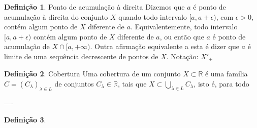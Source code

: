\documentclass{article}
\theoremstyle{definition}
\newtheorem{definition}{Definição}
\theoremstyle{remark}
\theoremstyle{plain}
\theoremstyle{plain}
\theoremstyle{plain}
\begin{document}
    \begin{definition}{Ponto de acumulação à direita}
        Dizemos que $a$ é ponto de acumulação à direita do conjunto $X$ quando todo intervalo $[a, a+\epsilon)$,
        com $\epsilon > 0$, contém algum ponto de $X$ diferente de $a$.
        Equivalentemente, todo intervalo $[a, a+\epsilon)$ contém algum ponto de $X$ diferente de $a$, ou então 
            que $a$ é ponto de acumulação de $X \cap [a, +\infty)$.
        Outra afirmação equivalente a esta é dizer que $a$ é limite de uma sequência decrescente de pontos de $X$.
        Notação: ${X'}_+$
    \end{definition}

    \newpage
    \begin{definition}{Cobertura}
        Uma cobertura de um conjunto $X \subset \mathbb{R}$ é uma família $C = \left( C_\lambda \right)_{\lambda \in L}$
        de conjuntos $C_\lambda \in \mathbb{R}$, tais que $X \subset \bigcup\limits_{\lambda \in L} C_\lambda$,
        isto é, para todo 
    \end{definition}

    ----
    
    \begin{definition}{}
    \end{definition}
\end{document}
